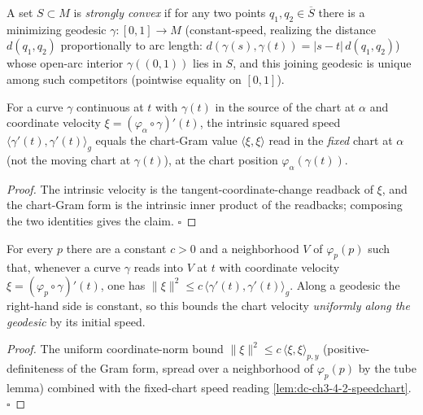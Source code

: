 \begin{definition}
  \label{def:dc-ch3-4-2-stronglyconvex}
  \leanok
  A set $S\subset M$ is \emph{strongly convex} if for any two points $q_1,q_2\in\overline{S}$
  there is a minimizing geodesic $\gamma:[0,1]\to M$ (constant-speed, realizing the distance
  $d(q_1,q_2)$ proportionally to arc length: $d(\gamma(s),\gamma(t))=|s-t|\,d(q_1,q_2)$) whose
  open-arc interior $\gamma((0,1))$ lies in $S$, and this joining geodesic is unique among such
  competitors (pointwise equality on $[0,1]$).
\end{definition}

\begin{lemma}
  \label{lem:dc-ch3-4-2-speedchart}
  \leanok
  For a curve $\gamma$ continuous at $t$ with $\gamma(t)$ in the source of the chart at $\alpha$ and
  coordinate velocity $\xi=(\varphi_\alpha\circ\gamma)'(t)$, the intrinsic squared speed
  $\langle\gamma'(t),\gamma'(t)\rangle_g$ equals the chart-Gram value
  $\langle\xi,\xi\rangle$ read in the \emph{fixed} chart at $\alpha$ (not the moving chart at
  $\gamma(t)$), at the chart position $\varphi_\alpha(\gamma(t))$.
\end{lemma}
\begin{proof}
  \leanok
  The intrinsic velocity is the tangent-coordinate-change readback of $\xi$, and the chart-Gram form
  is the intrinsic inner product of the readbacks; composing the two identities gives the claim. $\square$
\end{proof}

\begin{lemma}
  \label{lem:dc-ch3-4-2-velbound}
  \leanok
  For every $p$ there are a constant $c>0$ and a neighborhood $V$ of $\varphi_p(p)$ such that, whenever
  a curve $\gamma$ reads into $V$ at $t$ with coordinate velocity $\xi=(\varphi_p\circ\gamma)'(t)$, one
  has $\|\xi\|^2\le c\,\langle\gamma'(t),\gamma'(t)\rangle_g$. Along a geodesic the right-hand side is
  constant, so this bounds the chart velocity \emph{uniformly along the geodesic} by its initial speed.
\end{lemma}
\begin{proof}
  \leanok
  The uniform coordinate-norm bound $\|\xi\|^2\le c\,\langle\xi,\xi\rangle_{p,y}$ (positive-definiteness
  of the Gram form, spread over a neighborhood of $\varphi_p(p)$ by the tube lemma) combined with the
  fixed-chart speed reading \cref{lem:dc-ch3-4-2-speedchart}. $\square$
\end{proof}

